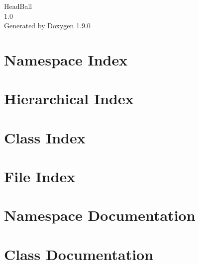 \let\mypdfximage\pdfximage\def\pdfximage{\immediate\mypdfximage}\documentclass[twoside]{book}
\newcommand{\+}{\discretionary{\mbox{\scriptsize$\hookleftarrow$}}{}{}}
\newcommand{\clearemptydoublepage}{%
  \newpage{\pagestyle{empty}\cleardoublepage}%
}
\begin{document}
\raggedbottom

\hypersetup{pageanchor=false,
             bookmarksnumbered=true,
             pdfencoding=unicode
            }
\begin{titlepage}
\vspace*{7cm}
\begin{center}%
{\Large Head\+Ball \\[1ex]\large 1.\+0 }\\
\vspace*{1cm}
{\large Generated by Doxygen 1.9.0}\\
\end{center}
\end{titlepage}
\clearemptydoublepage
{}
\tableofcontents
\clearemptydoublepage
{}
\hypersetup{pageanchor=true}

\chapter{Namespace Index}

\chapter{Hierarchical Index}

\chapter{Class Index}

\chapter{File Index}

\chapter{Namespace Documentation}


\chapter{Class Documentation}























\end{document}
